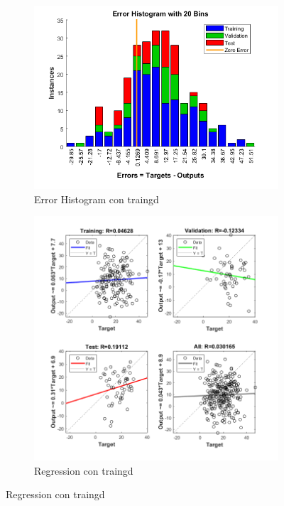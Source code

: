\documentclass[a4paper, 12pt]{article}
\begin{document}
\begin{figure}[htp!]
\begin{subfigure}{0.49\textwidth}
                    \end{subfigure}
                    \begin{subfigure}{0.49\textwidth}
                        \includegraphics[width=\textwidth]{figures/parte1/Ej3/Ej3_error_traingd_60.png}
                        \caption{Error Histogram con traingd}
                    \end{subfigure}
                    \begin{subfigure}{0.49\textwidth}
                        \includegraphics[width=\textwidth]{figures/parte1/Ej3/Ej3_regression_traingd_60.png}
                        \caption{Regression con traingd}
                    \end{subfigure}
                \end{figure}
\end{document}
